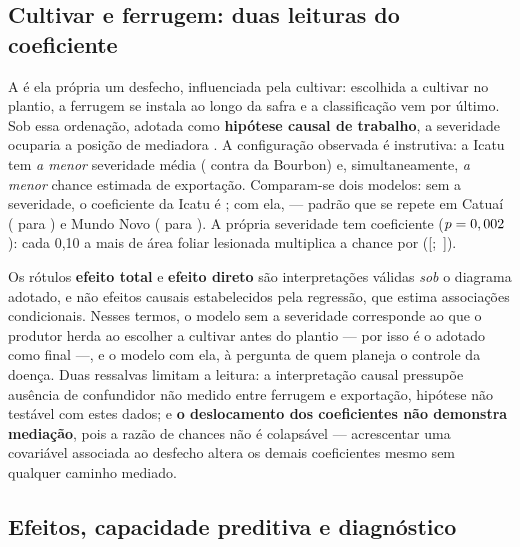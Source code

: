 \subsection{Cultivar e ferrugem: duas leituras do coeficiente}
\label{sec:mediacao}

A  é ela própria um desfecho, influenciada pela cultivar:
escolhida a cultivar no plantio, a ferrugem se instala ao longo da safra e a
classificação vem por último. Sob essa ordenação, adotada como \textbf{hipótese causal de
trabalho}, a severidade ocuparia a posição de mediadora \cite{pearl2009,vanderweele2016}.
A configuração observada é instrutiva: a Icatu tem \emph{a menor} severidade média
(\cSevMediaIcatu{} contra \cSevMediaBourbon{} da Bourbon) e, simultaneamente, \emph{a
menor} chance estimada de exportação. Comparam-se dois modelos: sem a severidade, o
coeficiente da Icatu é \cTotalIcatu{}; com ela, \cDiretoIcatu{} --- padrão que se repete
em Catuaí (\cTotalCatuai{} para \cDiretoCatuai{}) e Mundo Novo (\cTotalMundoNovo{} para
\cDiretoMundoNovo{}). A própria severidade tem coeficiente \cSevCoef{} ($p = 0,002$):
cada 0,10 a mais de área foliar lesionada multiplica a chance por \cSevORdez{}
([\cSevORdezLo;\ \cSevORdezHi]).

Os rótulos \textbf{efeito total} e \textbf{efeito direto} são interpretações válidas
\emph{sob} o diagrama adotado, e não efeitos causais estabelecidos pela regressão, que
estima associações condicionais. Nesses termos, o modelo sem a severidade corresponde ao
que o produtor herda ao escolher a cultivar antes do plantio --- por isso é o adotado
como final ---, e o modelo com ela, à pergunta de quem planeja o controle da doença. Duas
ressalvas limitam a leitura: a interpretação causal pressupõe ausência de confundidor não
medido entre ferrugem e exportação, hipótese não testável com estes dados; e \textbf{o
deslocamento dos coeficientes não demonstra mediação}, pois a razão de chances não é
colapsável \cite{greenland1999} --- acrescentar uma covariável associada ao desfecho
altera os demais coeficientes mesmo sem qualquer caminho mediado.

\subsection{Efeitos, capacidade preditiva e diagnóstico}
\label{sec:corte}

